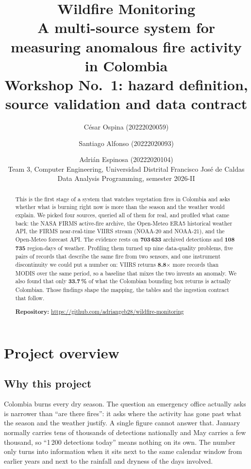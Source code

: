 \documentclass[11pt,a4paper]{article}
\title{\textbf{Wildfire Monitoring}\\[2pt]
\large A multi-source system for measuring anomalous fire activity in Colombia\\[10pt]
\normalsize Workshop No.~1: hazard definition, source validation and data contract}
\author{César Ospina (20222020059) \and Santiago Alfonso (20222020093) \and Adrián Espinosa (20222020104)\\
\normalsize Team 3, Computer Engineering, Universidad Distrital Francisco José de Caldas\\
\normalsize Data Analysis Programming, semester 2026-II}
\date{}
\begin{document}
\maketitle

\begin{abstract}
\noindent
This is the first stage of a system that watches vegetation fires in Colombia and asks whether
what is burning right now is more than the season and the weather would explain. We picked four
sources, queried all of them for real, and profiled what came back: the NASA FIRMS active-fire
archive, the Open-Meteo ERA5 historical weather API, the FIRMS near-real-time VIIRS stream
(NOAA-20 and NOAA-21), and the Open-Meteo forecast API. The evidence rests on \textbf{703\,633}
archived detections and \textbf{108\,735} region-days of weather. Profiling them turned up nine
data-quality problems, five pairs of records that describe the same fire from two sensors, and one
instrument discontinuity we could put a number on: VIIRS returns \textbf{8.8$\times$} more records
than MODIS over the same period, so a baseline that mixes the two invents an anomaly. We also found
that only \textbf{33.7\,\%} of what the Colombian bounding box returns is actually Colombian. Those
findings shape the mapping, the tables and the ingestion contract that follow.

\medskip\noindent\textbf{Repository:} \url{https://github.com/adriangeb28/wildfire-monitoring}
\end{abstract}

\tableofcontents

\section{Project overview}

\subsection{Why this project}

Colombia burns every dry season. The question an emergency office actually asks is narrower than
``are there fires'': it asks where the activity has gone past what the season and the weather
justify. A single figure cannot answer that. January normally carries tens of thousands of
detections nationally and May carries a few thousand, so ``1\,200 detections today'' means nothing
on its own. The number only turns into information when it sits next to the same calendar window
from earlier years and next to the rainfall and dryness of the days involved.
\end{document}
